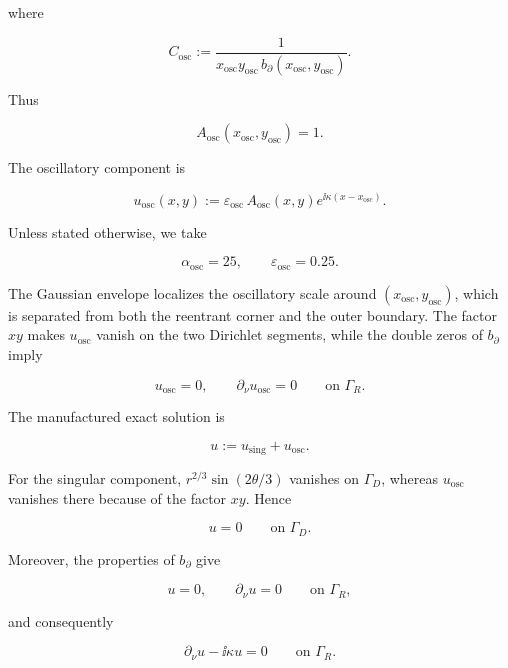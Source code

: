 where

\begin{equation}
\label{eq:lshape-oscillation-normalization}
  C_{\mathrm{osc}}
  :=
  \frac{1}{
    x_{\mathrm{osc}}y_{\mathrm{osc}}\,
    b_{\partial}(x_{\mathrm{osc}},y_{\mathrm{osc}})
  }.
\end{equation}

Thus

\[
  A_{\mathrm{osc}}
  (x_{\mathrm{osc}},y_{\mathrm{osc}})
  =1.
\]

The oscillatory component is

\begin{equation}
\label{eq:lshape-oscillation}
  u_{\mathrm{osc}}(x,y)
  :=
  \varepsilon_{\mathrm{osc}}\,
  A_{\mathrm{osc}}(x,y)
  e^{\ii\kappa(x-x_{\mathrm{osc}})}.
\end{equation}

Unless stated otherwise, we take

\begin{equation}
\label{eq:lshape-oscillation-parameters}
  \alpha_{\mathrm{osc}}=25,
  \qquad
  \varepsilon_{\mathrm{osc}}=0.25.
\end{equation}

The Gaussian envelope localizes the oscillatory scale around
$(x_{\mathrm{osc}},y_{\mathrm{osc}})$, which is separated from both the
reentrant corner and the outer boundary. The factor $xy$ makes
$u_{\mathrm{osc}}$ vanish on the two Dirichlet segments, while the
double zeros of $b_{\partial}$ imply

\[
  u_{\mathrm{osc}}=0,
  \qquad
  \partial_\nu u_{\mathrm{osc}}=0
  \qquad\text{on }\Gamma_R.
\]

The manufactured exact solution is

\begin{equation}
\label{eq:lshape-exact-solution}
  u
  :=
  u_{\mathrm{sing}}
  +
  u_{\mathrm{osc}}.
\end{equation}

For the singular component,
$r^{2/3}\sin(2\theta/3)$ vanishes on $\Gamma_D$, whereas
$u_{\mathrm{osc}}$ vanishes there because of the factor $xy$. Hence

\[
  u=0
  \qquad\text{on }\Gamma_D.
\]

Moreover, the properties of $b_{\partial}$ give

\[
  u=0,
  \qquad
  \partial_\nu u=0
  \qquad\text{on }\Gamma_R,
\]

and consequently

\[
  \partial_\nu u-\ii\kappa u=0
  \qquad\text{on }\Gamma_R.
\]

